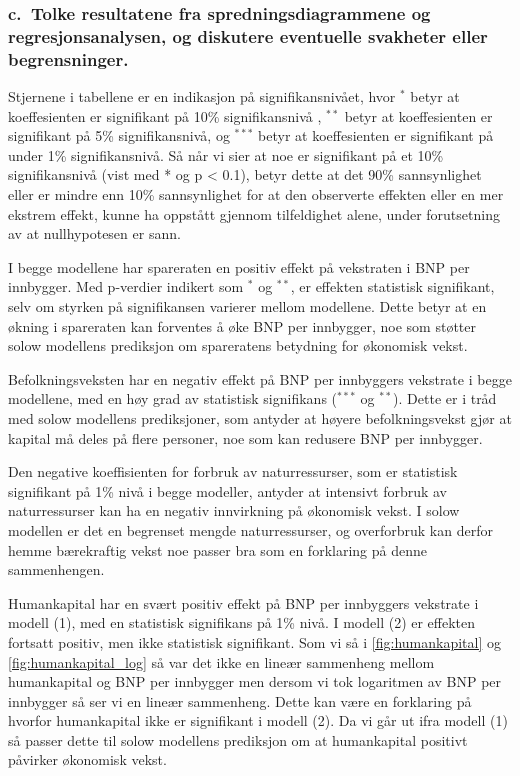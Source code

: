 \documentclass[
  12pt,
  a4paper,
  DIV=11,
  numbers=noendperiod]{scrartcl}
\begin{document}
\clearpage

\subsubsection{c.~Tolke resultatene fra spredningsdiagrammene og
regresjonsanalysen, og diskutere eventuelle svakheter eller
begrensninger.}\label{c.-tolke-resultatene-fra-spredningsdiagrammene-og-regresjonsanalysen-og-diskutere-eventuelle-svakheter-eller-begrensninger.}

Stjernene i tabellene er en indikasjon på signifikansnivået, hvor
\(^{*}\) betyr at koeffesienten er signifikant på 10\% signifikansnivå ,
\(^{**}\) betyr at koeffesienten er signifikant på 5\% signifikansnivå,
og \(^{***}\) betyr at koeffesienten er signifikant på under 1\%
signifikansnivå. Så når vi sier at noe er signifikant på et 10\%
signifikansnivå (vist med * og p \textless{} 0.1), betyr dette at det
90\% sannsynlighet eller er mindre enn 10\% sannsynlighet for at den
observerte effekten eller en mer ekstrem effekt, kunne ha oppstått
gjennom tilfeldighet alene, under forutsetning av at nullhypotesen er
sann.

I begge modellene har spareraten en positiv effekt på vekstraten i BNP
per innbygger. Med p-verdier indikert som \(^{*}\) og \(^{**}\), er
effekten statistisk signifikant, selv om styrken på signifikansen
varierer mellom modellene. Dette betyr at en økning i spareraten kan
forventes å øke BNP per innbygger, noe som støtter solow modellens
prediksjon om spareratens betydning for økonomisk vekst.

Befolkningsveksten har en negativ effekt på BNP per innbyggers vekstrate
i begge modellene, med en høy grad av statistisk signifikans (\(^{***}\)
og \(^{**}\)). Dette er i tråd med solow modellens prediksjoner, som
antyder at høyere befolkningsvekst gjør at kapital må deles på flere
personer, noe som kan redusere BNP per innbygger.

Den negative koeffisienten for forbruk av naturressurser, som er
statistisk signifikant på 1\% nivå i begge modeller, antyder at
intensivt forbruk av naturressurser kan ha en negativ innvirkning på
økonomisk vekst. I solow modellen er det en begrenset mengde
naturressurser, og overforbruk kan derfor hemme bærekraftig vekst noe
passer bra som en forklaring på denne sammenhengen.

Humankapital har en svært positiv effekt på BNP per innbyggers vekstrate
i modell (1), med en statistisk signifikans på 1\% nivå. I modell (2) er
effekten fortsatt positiv, men ikke statistisk signifikant. Som vi så i
\autoref{fig:humankapital} og \autoref{fig:humankapital_log} så var det
ikke en lineær sammenheng mellom humankapital og BNP per innbygger men
dersom vi tok logaritmen av BNP per innbygger så ser vi en lineær
sammenheng. Dette kan være en forklaring på hvorfor humankapital ikke er
signifikant i modell (2). Da vi går ut ifra modell (1) så passer dette
til solow modellens prediksjon om at humankapital positivt påvirker
økonomisk vekst.
\end{document}
